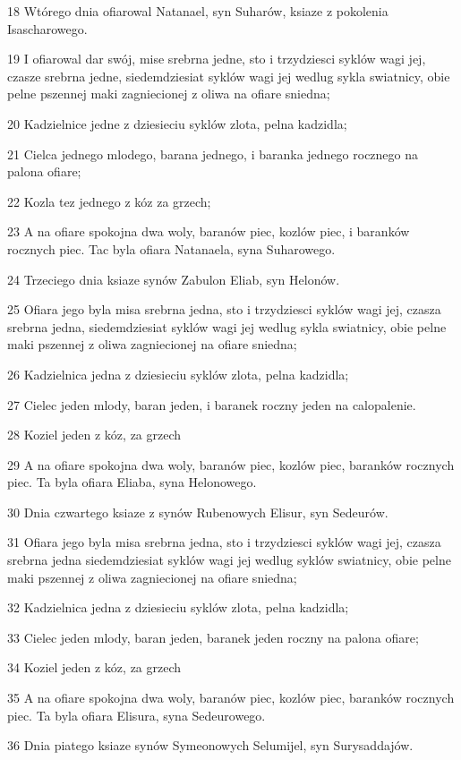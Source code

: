 \par 18 Wtórego dnia ofiarowal Natanael, syn Suharów, ksiaze z pokolenia Isascharowego.
\par 19 I ofiarowal dar swój, mise srebrna jedne, sto i trzydziesci syklów wagi jej, czasze srebrna jedne, siedemdziesiat syklów wagi jej wedlug sykla swiatnicy, obie pelne pszennej maki zagniecionej z oliwa na ofiare sniedna;
\par 20 Kadzielnice jedne z dziesieciu syklów zlota, pelna kadzidla;
\par 21 Cielca jednego mlodego, barana jednego, i baranka jednego rocznego na palona ofiare;
\par 22 Kozla tez jednego z kóz za grzech;
\par 23 A na ofiare spokojna dwa woly, baranów piec, kozlów piec, i baranków rocznych piec. Tac byla ofiara Natanaela, syna Suharowego.
\par 24 Trzeciego dnia ksiaze synów Zabulon Eliab, syn Helonów.
\par 25 Ofiara jego byla misa srebrna jedna, sto i trzydziesci syklów wagi jej, czasza srebrna jedna, siedemdziesiat syklów wagi jej wedlug sykla swiatnicy, obie pelne maki pszennej z oliwa zagniecionej na ofiare sniedna;
\par 26 Kadzielnica jedna z dziesieciu syklów zlota, pelna kadzidla;
\par 27 Cielec jeden mlody, baran jeden, i baranek roczny jeden na calopalenie.
\par 28 Koziel jeden z kóz, za grzech
\par 29 A na ofiare spokojna dwa woly, baranów piec, kozlów piec, baranków rocznych piec. Ta byla ofiara Eliaba, syna Helonowego.
\par 30 Dnia czwartego ksiaze z synów Rubenowych Elisur, syn Sedeurów.
\par 31 Ofiara jego byla misa srebrna jedna, sto i trzydziesci syklów wagi jej, czasza srebrna jedna siedemdziesiat syklów wagi jej wedlug syklów swiatnicy, obie pelne maki pszennej z oliwa zagniecionej na ofiare sniedna;
\par 32 Kadzielnica jedna z dziesieciu syklów zlota, pelna kadzidla;
\par 33 Cielec jeden mlody, baran jeden, baranek jeden roczny na palona ofiare;
\par 34 Koziel jeden z kóz, za grzech
\par 35 A na ofiare spokojna dwa woly, baranów piec, kozlów piec, baranków rocznych piec. Ta byla ofiara Elisura, syna Sedeurowego.
\par 36 Dnia piatego ksiaze synów Symeonowych Selumijel, syn Surysaddajów.
